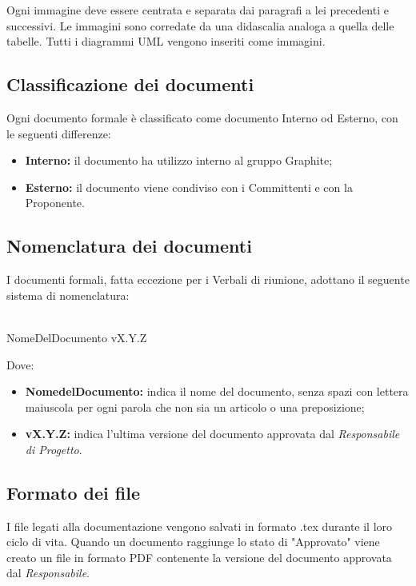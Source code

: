 \documentclass[../NormediProgetto.tex]{subfiles}
\begin{document}
Ogni immagine deve essere centrata e separata dai paragrafi a lei precedenti e successivi. Le immagini sono corredate da una didascalia analoga a quella delle tabelle. Tutti i diagrammi UML vengono inseriti come immagini.

\subsection{Classificazione dei documenti}

Ogni documento formale è classificato come documento Interno od Esterno, con le seguenti differenze:

\begin{itemize}
    \item \textbf{Interno:} il documento ha utilizzo interno al gruppo Graphite;
    \item \textbf{Esterno:} il documento viene condiviso con i Committenti e con la Proponente.
\end{itemize}

\subsection{Nomenclatura dei documenti}

I documenti formali, fatta eccezione per i Verbali di riunione, adottano il seguente sistema di nomenclatura:

\\ NomeDelDocumento vX.Y.Z

Dove:

\begin{itemize}
    \item \textbf{NomedelDocumento:} indica il nome del documento, senza spazi con lettera maiuscola per ogni parola che non sia un articolo o una preposizione;
    
    \item \textbf{vX.Y.Z:}  indica l'ultima versione del documento approvata dal \textit{Responsabile di Progetto}.
\end{itemize}

\subsection{Formato dei file}
I file legati alla documentazione vengono salvati in formato .tex durante il loro ciclo di vita. Quando un documento raggiunge lo stato di "Approvato" viene creato un file in formato PDF contenente la versione del documento approvata dal \textit{Responsabile}.
\end{document}
